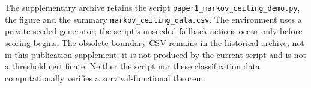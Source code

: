  The supplementary archive retains the script \texttt{paper1\_markov\_ceiling\_demo.py}, the figure and the summary \texttt{markov\_ceiling\_data.csv}. The environment uses a private seeded generator; the script's unseeded fallback actions occur only before scoring begins. The obsolete boundary CSV remains in the historical archive, not in this publication supplement; it is not produced by the current script and is not a threshold certificate. Neither the script nor these classification data computationally verifies a survival-functional theorem.


